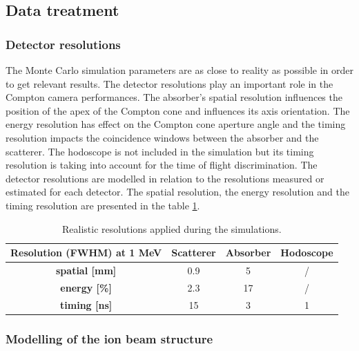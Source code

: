 \documentclass[12pt]{iopart}
\begin{document}
\subsection{Data treatment}
\label{subsection:Treatment_data_CC_hadrontherapy_Geant4}

\subsubsection{Detector resolutions\newline}
\label{subsubsection:Resolution_detector_CC_hadrontherapy_Geant4}

The Monte Carlo simulation parameters are as close to reality as possible in order to get relevant results. The detector resolutions play an important role in the Compton camera performances. The absorber's spatial resolution influences the position of the apex of the Compton cone and influences its axis orientation. The energy resolution has effect on the  Compton cone aperture angle and the timing resolution impacts the coincidence windows between the absorber and the scatterer. The hodoscope is not included in the simulation but its timing resolution is taking into account for the time of flight discrimination. The detector resolutions are modelled in relation to the resolutions measured or estimated for each detector. The spatial resolution, the energy resolution and the timing resolution are presented in the table \ref{table:table_resolution_detecteurs_CC_simulation_Hadronth}.

\begin{table} [!htbp]
\centering
\caption{Realistic resolutions applied during the simulations.}
\begin{tabular}{cccc}
\hline
\textbf{Resolution (FWHM) at 1 MeV} & \textbf{Scatterer} & \textbf{Absorber} &\textbf{Hodoscope}\\
\hline 
\textbf{spatial [mm]	}			 &     0.9		 &  5	 			&   /	\\
\textbf{energy [\%]}				&	2.3		&  17				&   /     \\
\textbf{timing [ns]}	        			&	15		&	3 			&  1     \\
\hline
\end{tabular}
\label{table:table_resolution_detecteurs_CC_simulation_Hadronth}
\end{table}

\subsubsection{Modelling of the ion beam structure\newline}
\label{subsubsection:modelisation_fasceau_ions_CC_hadrontherapy_Geant4}
 
\end{document}
